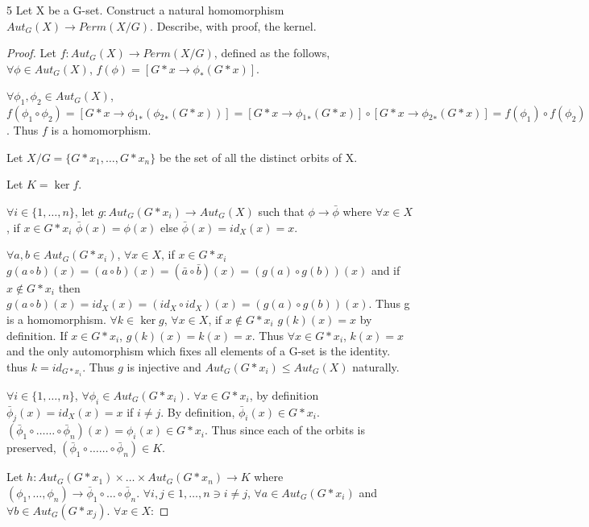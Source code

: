\documentclass{article}
\begin{document}
\bigskip

\begin{PROB}{5}\label{Problem 5.}
    Let X be a G-set. Construct a natural homomorphism $Aut_G(X) \to Perm(X/G)$. Describe, with proof, the kernel. 
\end{PROB}
\begin{proof}
    Let $f: Aut_G(X) \to Perm(X/G)$, defined as the follows, $\forall \phi \in Aut_G(X)$, $f(\phi) = [G \ast x \to \phi_*(G \ast x)]$. 

    $\forall \phi_1, \phi_2 \in Aut_G(X)$, $f(\phi_1 \circ \phi_2) = [G \ast x \to \phi{_1}_*(\phi{_2}_*(G \ast x))] = [G \ast x \to \phi{_1}_*(G \ast x)] \circ [G \ast x \to \phi{_2}_*(G \ast x)] = f(\phi_1) \circ f(\phi_2)$. Thus $f$ is a homomorphism.

    Let $X/G = \{G \ast x_1, \ldots, G \ast x_n\}$ be the set of all the distinct orbits of X. 

    Let $K = \ker f$. 

    $\forall i \in \{1, \ldots, n\}$, let $g: Aut_G(G \ast x_i) \to Aut_G(X)$ such that $\phi \to \bar \phi$ where $\forall x \in X$, if $x \in G \ast x_i$ $\bar \phi(x) = \phi(x)$ else $\bar \phi(x) = id_X(x) = x$. 
    
    $\forall a, b \in Aut_G(G \ast x_i)$, $\forall x \in X$, if $x \in G \ast x_i$ $g(a \circ b)(x) = (a \circ b)(x) = (\bar a \circ \bar b)(x) = (g(a) \circ g(b))(x)$ and if $x \not \in G \ast x_i$ then $g(a \circ b)(x) = id_X(x) = (id_X \circ id_X)(x) = (g(a) \circ g(b))(x)$. Thus g is a homomorphism. $\forall k \in \ker g$, $\forall x \in X$, if $x \not \in G \ast x_i$ $g(k)(x) = x$ by definition. If $x \in G \ast x_i$, $g(k)(x) = k(x) = x$. Thus $\forall x \in G \ast x_i$, $k(x) = x$ and the only automorphism which fixes all elements of a G-set is the identity. thus $k = id_{G \ast x_i}$. Thus $g$ is injective and $Aut_G(G \ast x_i) \leq Aut_G(X)$ naturally.



    $\forall i \in \{1, \ldots, n\}$, $\forall \phi_i \in Aut_G(G \ast x_i)$. $\forall x \in G \ast x_i$, by definition $\bar \phi_j(x) = id_X(x) = x$ if $i \neq j$. By definition, $\bar \phi_i(x) \in G \ast x_i$. $(\bar \phi_1 \circ \ldots \ldots \circ \bar \phi_n)(x) = \phi_i(x) \in G \ast x_i$. Thus since each of the orbits is preserved, $(\bar \phi_1 \circ \ldots \ldots \circ \bar \phi_n) \in K$.

    Let $h: Aut_G(G \ast x_1) \times \ldots \times Aut_G(G \ast x_n) \to K$ where $(\phi_1, \ldots, \phi_n) \to \bar \phi_1 \circ \ldots \circ \bar \phi_n$. $\forall i, j \in {1, \ldots, n} \ni i \neq j$, $\forall a \in Aut_G(G \ast x_i)$ and $\forall b \in Aut_G(G \ast x_j)$. $\forall x \in X$: 


\end{proof}
\end{document}

